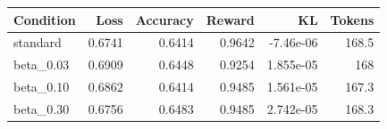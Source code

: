 \begin{center}\small
\begin{tabular}{lrrrrr}
\toprule
Condition & Loss & Accuracy & Reward & KL & Tokens \\
\midrule
standard & 0.6741 & 0.6414 & 0.9642 & -7.46e-06 & 168.5 \\
beta\_0.03 & 0.6909 & 0.6448 & 0.9254 & 1.855e-05 & 168 \\
beta\_0.10 & 0.6862 & 0.6414 & 0.9485 & 1.561e-05 & 167.3 \\
beta\_0.30 & 0.6756 & 0.6483 & 0.9485 & 2.742e-05 & 168.3 \\
\bottomrule
\end{tabular}
\end{center}

